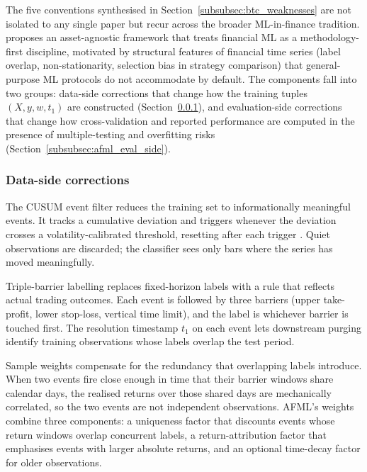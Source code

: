 The five conventions synthesised in Section~\ref{subsubsec:btc_weaknesses} are not isolated to any single paper but recur across the broader ML-in-finance tradition. \citet{lopez_de_prado_2018} proposes an asset-agnostic framework that treats financial ML as a methodology-first discipline, motivated by structural features of financial time series (label overlap, non-stationarity, selection bias in strategy comparison) that general-purpose ML protocols do not accommodate by default. The components fall into two groups: data-side corrections that change how the training tuples $(X, y, w, t_1)$ are constructed (Section~\ref{subsubsec:afml_data_side}), and evaluation-side corrections that change how cross-validation and reported performance are computed in the presence of multiple-testing and overfitting risks (Section~\ref{subsubsec:afml_eval_side}).


\subsubsection{Data-side corrections}\label{subsubsec:afml_data_side}

The CUSUM event filter reduces the training set to informationally meaningful events. It tracks a cumulative deviation and triggers whenever the deviation crosses a volatility-calibrated threshold, resetting after each trigger \citep[Snippet 2.4]{lopez_de_prado_2018}. Quiet observations are discarded; the classifier sees only bars where the series has moved meaningfully.

Triple-barrier labelling replaces fixed-horizon labels with a rule that reflects actual trading outcomes. Each event is followed by three barriers (upper take-profit, lower stop-loss, vertical time limit), and the label is whichever barrier is touched first. The resolution timestamp $t_1$ on each event lets downstream purging identify training observations whose labels overlap the test period.

Sample weights compensate for the redundancy that overlapping labels introduce. When two events fire close enough in time that their barrier windows share calendar days, the realised returns over those shared days are mechanically correlated, so the two events are not independent observations. AFML's weights combine three components: a uniqueness factor that discounts events whose return windows overlap concurrent labels, a return-attribution factor that emphasises events with larger absolute returns, and an optional time-decay factor for older observations.

